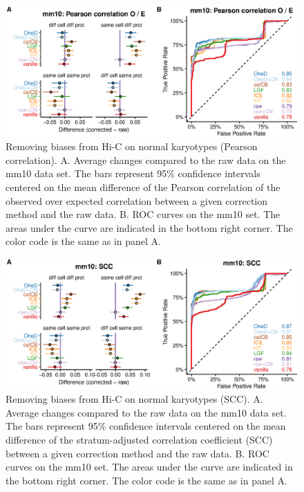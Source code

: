 \documentclass[12pt]{report}
\begin{document}
\begin{figure}
	\centerline{\includegraphics[width=\textwidth]{nar_figures/supp_figure_9.eps}}
    \caption{
    Removing biases from Hi-C on normal karyotypes (Pearson correlation). A. Average changes
    compared to the raw data on the mm10 data set. The bars represent
    95\% confidence intervals centered on the mean difference of the
    Pearson correlation of the observed over expected correlation between a given correction method and the raw
    data. B. ROC curves on the mm10 set. The areas under the curve are indicated
    in the bottom right corner. The color code is the same as in panel A.}
\end{figure}

\begin{figure}
	\centerline{\includegraphics[width=\textwidth]{nar_figures/supp_figure_10.eps}}
    \caption{
    Removing biases from Hi-C on normal karyotypes (SCC). A. Average changes
    compared to the raw data on the mm10 data set. The bars represent
    95\% confidence intervals centered on the mean difference of the
    stratum-adjusted correlation coefficient (SCC) between a given correction method and the raw
    data. B. ROC curves on the mm10 set. The areas under the curve are indicated
    in the bottom right corner. The color code is the same as in panel A.}
\end{figure}
\end{document}
